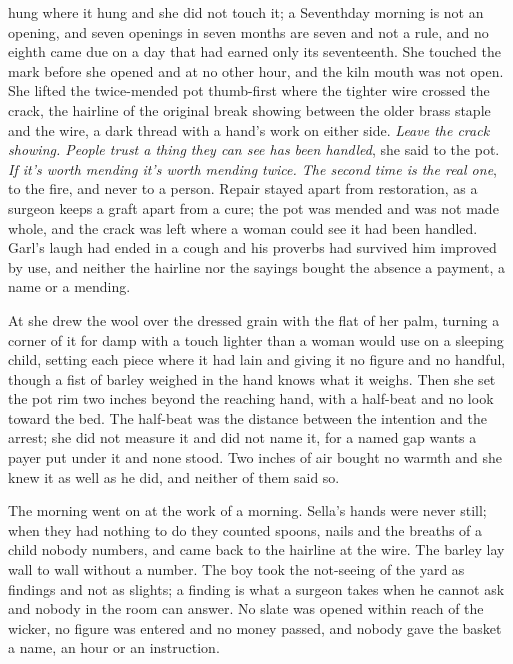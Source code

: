  hung where it hung and she did not touch it; a Seventhday morning is not an opening, and seven openings in seven months are seven and not a rule, and no eighth came due on a day that had earned only its seventeenth. She touched the mark before she opened  and at no other hour, and the kiln mouth was not open. She lifted the twice-mended pot thumb-first where the tighter wire crossed the crack, the hairline of the original break showing between the older brass staple and the wire, a dark thread with a hand's work on either side. \emph{Leave the crack showing. People trust a thing they can see has been handled}, she said to the pot. \emph{If it's worth mending it's worth mending twice. The second time is the real one}, to the fire, and never to a person. Repair stayed apart from restoration, as a surgeon keeps a graft apart from a cure; the pot was mended and was not made whole, and the crack was left where a woman could see it had been handled. Garl's laugh had ended in a cough and his proverbs had survived him improved by use, and neither the hairline nor the sayings bought the absence a payment, a name or a mending.

At  she drew the wool over the dressed grain with the flat of her palm, turning a corner of it for damp with a touch lighter than a woman would use on a sleeping child, setting each piece where it had lain and giving it no figure and no handful, though a fist of barley weighed in the hand knows what it weighs. Then she set the pot rim two inches beyond the reaching hand, with a half-beat and no look toward the bed. The half-beat was the distance between the intention and the arrest; she did not measure it and did not name it, for a named gap wants a payer put under it and none stood. Two inches of air bought no warmth and she knew it as well as he did, and neither of them said so.

The morning went on at the work of a morning. Sella's hands were never still; when they had nothing to do they counted spoons, nails and the breaths of a child nobody numbers, and came back to the hairline at the wire. The barley lay wall to wall without a number. The boy took the not-seeing of the yard as findings and not as slights; a finding is what a surgeon takes when he cannot ask and nobody in the room can answer. No slate was opened within reach of the wicker, no figure was entered and no money passed, and nobody gave the basket a name, an hour or an instruction.

\scenebreak

